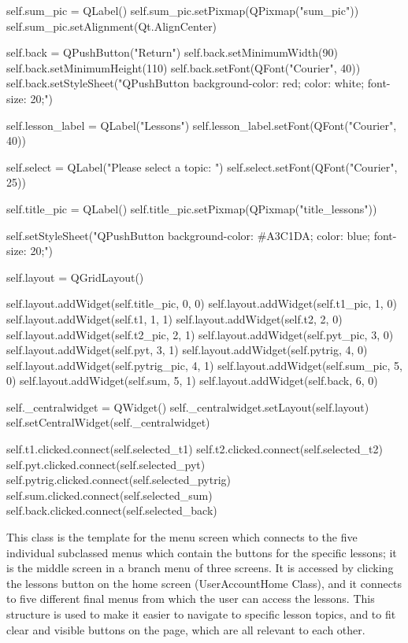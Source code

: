 \begin{python}
        self.sum_pic = QLabel()
        self.sum_pic.setPixmap(QPixmap("sum_pic"))
        self.sum_pic.setAlignment(Qt.AlignCenter)

        self.back = QPushButton("Return")
        self.back.setMinimumWidth(90)
        self.back.setMinimumHeight(110)
        self.back.setFont(QFont("Courier", 40))
        self.back.setStyleSheet("QPushButton {background-color: red; color: white; font-size: 20;}")
    
        self.lesson_label = QLabel("Lessons")
        self.lesson_label.setFont(QFont("Courier", 40))
        
        self.select = QLabel("Please select a topic: ")
        self.select.setFont(QFont("Courier", 25))
        
        self.title_pic = QLabel()
        self.title_pic.setPixmap(QPixmap("title_lessons"))

        self.setStyleSheet("QPushButton {background-color: #A3C1DA; color: blue; font-size: 20;}")

        self.layout = QGridLayout()

        self.layout.addWidget(self.title_pic, 0, 0) 
        self.layout.addWidget(self.t1_pic, 1, 0)
        self.layout.addWidget(self.t1, 1, 1)
        self.layout.addWidget(self.t2, 2, 0)
        self.layout.addWidget(self.t2_pic, 2, 1)
        self.layout.addWidget(self.pyt_pic, 3, 0)
        self.layout.addWidget(self.pyt, 3, 1)
        self.layout.addWidget(self.pytrig, 4, 0)
        self.layout.addWidget(self.pytrig_pic, 4, 1)
        self.layout.addWidget(self.sum_pic, 5, 0)
        self.layout.addWidget(self.sum, 5, 1)
        self.layout.addWidget(self.back, 6, 0)

        self._centralwidget = QWidget()
        self._centralwidget.setLayout(self.layout)
        self.setCentralWidget(self._centralwidget)

        self.t1.clicked.connect(self.selected_t1) 
        self.t2.clicked.connect(self.selected_t2)
        self.pyt.clicked.connect(self.selected_pyt)
        self.pytrig.clicked.connect(self.selected_pytrig)
        self.sum.clicked.connect(self.selected_sum)
        self.back.clicked.connect(self.selected_back)
\end{python}

This class is the template for the menu screen which connects to the five individual subclassed menus which contain the buttons for the specific lessons; it is the middle screen in a branch menu of three screens. It is accessed by clicking the lessons button on the home screen (UserAccountHome Class), and it connects to five different final menus from which the user can access the lessons. This structure is used to make it easier to navigate to specific lesson topics, and to fit clear and visible buttons on the page, which are all relevant to each other. 

